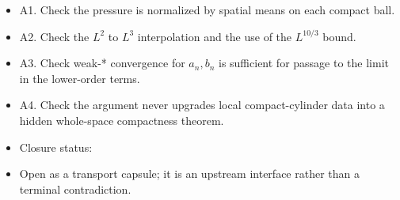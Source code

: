 \documentclass[11pt]{article}
\theoremstyle{plain}
\theoremstyle{definition}
\theoremstyle{remark}
\begin{document}
\begin{itemize}
  \item A1. Check the pressure is normalized by spatial means on each compact ball.
  \item A2. Check the $L^2$ to $L^3$ interpolation and the use of the $L^{10/3}$ bound.
  \item A3. Check weak-* convergence for $a_n,b_n$ is sufficient for passage to the limit in the lower-order terms.
  \item A4. Check the argument never upgrades local compact-cylinder data into a hidden whole-space compactness theorem.
  \item Closure status:
  \item Open as a transport capsule; it is an upstream interface rather than a terminal contradiction.
\end{itemize}
\end{document}
